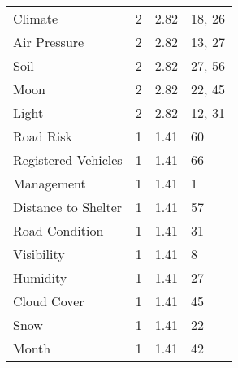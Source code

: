 \begin{longtable}[c]{p{3.5cm}p{2.0cm}p{2.5cm}p{5.5cm}}
  Climate &   2 & 2.82 & 18, 26 \\ 
  Air Pressure &   2 & 2.82 & 13, 27 \\ 
  Soil &   2 & 2.82 & 27, 56 \\ 
  Moon &   2 & 2.82 & 22, 45 \\ 
  Light &   2 & 2.82 & 12, 31 \\ 
  Road Risk &   1 & 1.41 & 60 \\ 
  Registered Vehicles &   1 & 1.41 & 66 \\ 
  Management &   1 & 1.41 & 1 \\ 
  Distance to Shelter &   1 & 1.41 & 57 \\ 
  Road Condition &   1 & 1.41 & 31 \\ 
  Visibility &   1 & 1.41 & 8 \\ 
  Humidity &   1 & 1.41 & 27 \\ 
  Cloud Cover &   1 & 1.41 & 45 \\ 
  Snow &   1 & 1.41 & 22 \\ 
  Month &   1 & 1.41 & 42 \\ 
   \hline
\end{longtable}

